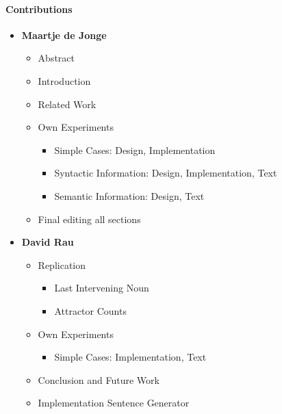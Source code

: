 \pagebreak

\paragraph{Contributions}

\begin{itemize}
  \item \textbf{Maartje de Jonge}
  \begin{itemize}
    \item Abstract
    \item Introduction
    \item Related Work
    \item Own Experiments
    \begin{itemize}
       \item Simple Cases: Design, Implementation
       \item Syntactic Information: Design, Implementation, Text
       \item Semantic Information: Design, Text
    \end{itemize}
    \item Final editing all sections        
  \end{itemize}

  \item \textbf{David Rau}
    \begin{itemize}
     \item Replication
      \begin{itemize}
         \item Last Intervening Noun
         \item Attractor Counts
      \end{itemize}    
     \item Own Experiments
    \begin{itemize}
       \item Simple Cases: Implementation, Text
    \end{itemize}        
      \item Conclusion and Future Work
      \item Implementation Sentence Generator
  \end{itemize}


\end{itemize}


